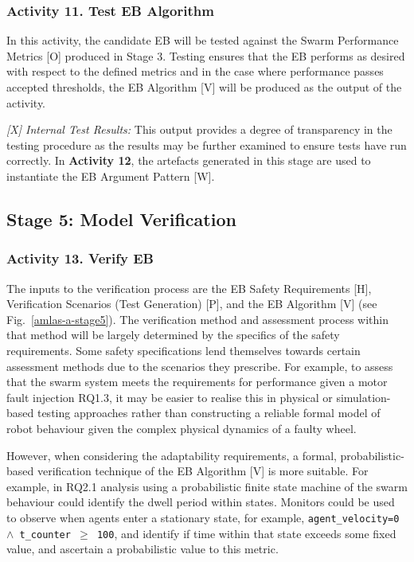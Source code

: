 \documentclass[runningheads]{llncs}
\begin{document}
\subsubsection*{Activity 11. Test EB Algorithm}

In this activity, the candidate EB will be tested against the Swarm Performance Metrics [O] produced in Stage 3. Testing ensures that the EB performs as desired with respect to the defined metrics and in the case where performance passes accepted thresholds, the EB Algorithm [V] will be produced as the output of the activity. 

\emph{[X] Internal Test Results:} This output provides a degree of transparency in the testing procedure as the results may be further examined to ensure tests have run correctly. 
In \textbf{Activity 12}, the artefacts generated in this stage are used to instantiate the EB Argument Pattern [W].

\subsection{Stage 5: Model Verification} \label{framework-stage5}
\subsubsection*{Activity 13. Verify EB}
The inputs to the verification process are the EB Safety Requirements [H], Verification Scenarios (Test Generation) [P], and the EB Algorithm [V] (see Fig.~\ref{amlas-a-stage5}). 
%
The verification method and assessment process within that method will be largely determined by the specifics of the safety requirements. Some safety specifications lend themselves towards certain assessment methods due to the scenarios they prescribe.
%
For example, to assess that the swarm system meets the requirements for performance given a motor fault injection RQ1.3, it may be easier to realise this in physical or simulation-based testing approaches rather than constructing a reliable formal model of robot behaviour given the complex physical dynamics of a faulty wheel.

%
However, when considering the adaptability requirements, a formal, probabilistic-based verification technique of the EB Algorithm [V] is more suitable. For example, in RQ2.1 analysis using a probabilistic finite state machine of the swarm behaviour could identify the dwell period within states. Monitors could be used to observe when agents enter a stationary state, for example, \texttt{agent\_velocity=0 $\land $  t\_counter  $\ge$ 100}, and identify if time within that state exceeds some fixed value, and ascertain a probabilistic value to this metric.
\end{document}
